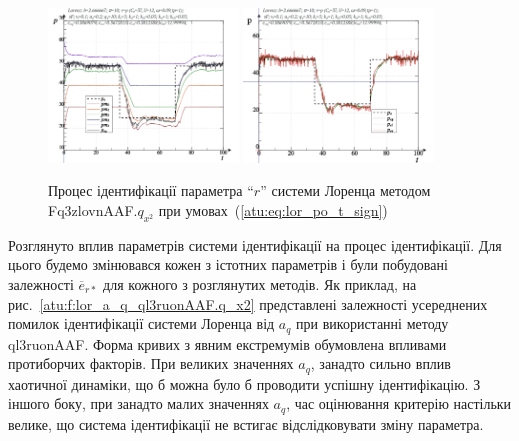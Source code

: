 \documentclass[a4paper,13pt]{atuaref}
\begin{document}
\begin{figure}[ht!]
  \centerline{
    \includegraphics[width=0.45\textwidth]{p5/p/cha/lor/Fq3zlovnAAF/lor_Fq3zlovnAAF_qx2-pl_n_sign.png}
    \hfill
    \includegraphics[width=0.45\textwidth]{p5/p/cha/lor/Fq3zlovnAAF/lor_Fq3zlovnAAF_qx2-p_p_sign.png}
  }
  \caption{Процес ідентифікації параметра ``$r$'' системи Лоренца методом Fq3zlovnAAF.$q_{x^2}$ при умовах~(\ref{atu:eq:lor_po_t_sign})}
  \label{atu:f:lor_id_Fq3zlovnAAF.q_x2_sign}
\end{figure}


Розглянуто вплив параметрів системи ідентифікації на процес ідентифікації. Для
цього будемо змінювався кожен з істотних параметрів і були побудовані
залежності $\overline {e}_{r*} $ для кожного з розглянутих методів.
Як приклад,
на рис.~\ref{atu:f:lor_a_q_ql3ruonAAF.q_x2} представлені залежності
усереднених помилок ідентифікації системи Лоренца від $ a_q $ при використанні
методу ql3ruonAAF.
Форма кривих з явним екстремумів обумовлена впливами протиборчих
факторів. При великих значеннях $ a_q $, занадто сильно вплив хаотичної
динаміки, що б можна було б проводити успішну ідентифікацію. З іншого боку, при
занадто малих значеннях $ a_q $, час оцінювання критерію настільки велике, що
система ідентифікації не встигає відслідковувати зміну параметра.
\end{document}
